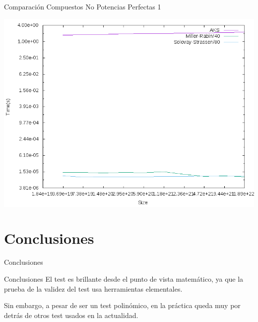 \documentclass{beamer}
\begin{document}
\begin{frame}{Comparación Compuestos No Potencias Perfectas 1}
	\begin{alertblock}{}
		\begin{center}
			\includegraphics[scale=0.40]{../Memoria/img/graphs/aks-probs-comps-32-mean}
		\end{center}
	\end{alertblock}
\end{frame}

\section{Conclusiones}

\begin{frame}
	\centering
	\begin{Huge}
		Conclusiones
	\end{Huge}
\end{frame}

\begin{frame}{Conclusiones}
	\onslide<1->El test es brillante desde el punto de vista matemático, ya que la prueba de la validez del test usa herramientas elementales.\break
	
	Sin embargo, a pesar de ser un test polinómico, en la práctica queda muy por detrás de otros test usados en la actualidad.
\end{frame}

\end{document}
